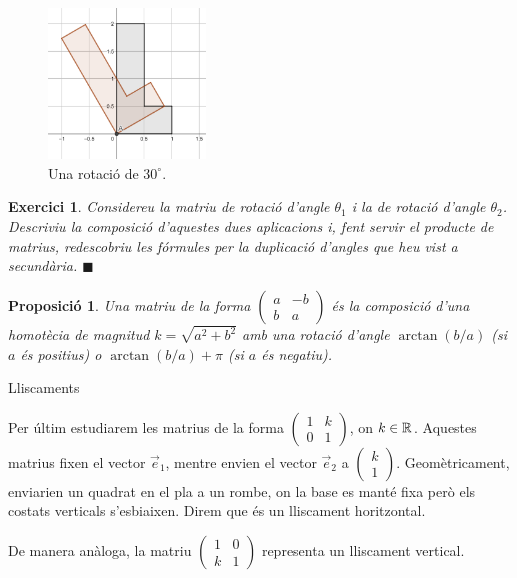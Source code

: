 \documentclass[
  11pt,
]{book}
\makeatletter
\numberwithin{dummy}{section}
\theoremstyle{maincolornumbox}
\newtheorem{exerciseT}{Exercici}[chapter]
\theoremstyle{blacknumex}
\theoremstyle{blacknumbox}
\theoremstyle{maincolornum}
\newtheorem{propositionT}{Proposició}[chapter]
\newenvironment{proposition}{\begin{pBox}\begin{propositionT}}{\end{propositionT}\end{pBox}}
\newenvironment{exercise}{\begin{eBox}\begin{exerciseT}}{\hfill{\color{maincolor}\tiny\ensuremath{\blacksquare}}\end{exerciseT}\end{eBox}}
\renewcommand{\subsection}{\@startsection {subsection}{2}{\z@}
{-3ex \@plus -0.1ex \@minus -.4ex}
{0.5ex \@plus.2ex }
{\normalfont\sffamily\bfseries}}
\makeatother
\begin{document}
\begin{figure}
\centering
\includegraphics[width=\textwidth,height=4cm]{rotacio.png}
\caption{Una rotació de \(30^\circ\).}\label{fig:rotacio}
\end{figure}

\begin{exercise}
Considereu la matriu de rotació d'angle \(\theta_1\) i la de rotació
d'angle \(\theta_2\). Descriviu la composició d'aquestes dues aplicacions
i, fent servir el producte de matrius, redescobriu les fórmules per la
duplicació d'angles que heu vist a secundària.
\end{exercise}

\begin{proposition}
Una matriu de la forma \(\begin{pmatrix}a&-b\\b&a\end{pmatrix}\) és
la composició d'una homotècia de magnitud \(k=\sqrt{a^2+b^2}\) amb una
rotació d'angle \(\arctan(b/a)\) (si \(a\) és positius) o
\(\arctan(b/a) + \pi\) (si \(a\) és negatiu).
\end{proposition}

\subsection{Lliscaments}\label{lliscaments}

Per últim estudiarem les matrius de la forma
\(\begin{pmatrix} 1&k\\0&1\end{pmatrix}\), on \(k\in \mathbb{R}\). Aquestes matrius
fixen el vector \(\vec e_1\), mentre envien el vector \(\vec e_2\) a
\(\begin{pmatrix}k\\1\end{pmatrix}\). Geomètricament, enviarien un quadrat
en el pla a un rombe, on la base es manté fixa però els costats
verticals s'esbiaixen. Direm que és un lliscament horitzontal.

De manera anàloga, la matriu \(\begin{pmatrix}1&0\\k&1\end{pmatrix}\)
representa un lliscament vertical.
\end{document}
